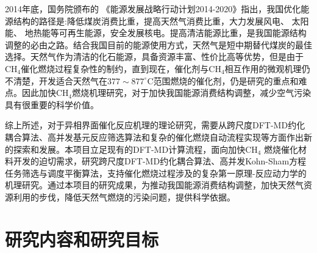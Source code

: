2014年底，国务院颁布的 《能源发展战略行动计划2014-2020》指出，我国优化能源结构的路径是:降低煤炭消费比重，提高天然气消费比重，大力发展风电、 太阳能、 地热能等可再生能源，安全发展核电。提高清洁能源比重，是我国能源结构调整的必由之路。结合我国目前的能源使用方式，天然气是短中期替代煤炭的最佳选择。天然气作为清洁的化石能源，具备资源丰富、性价比高等优势，但是由于$\mathrm{CH}_4$催化燃烧过程复杂性的制约，直到现在，催化剂与$\mathrm{CH}_4$相互作用的微观机理仍不清楚，开发适合天然气在$377\sim877^{\circ}\mathrm{C}$范围燃烧的催化剂，仍是研究的重点和难点。\cite{ProcChem15-242_2003}因此加快$\mathrm{CH}_4$燃烧机理研究，对于加快我国能源消费结构调整，减少空气污染具有很重要的科学价值。

综上所述，对于异相界面催化反应机理的理论研究，需要从跨尺度\textrm{DFT-MD}约化耦合算法、高并发基元反应筛选算法和复杂的催化燃烧自动流程实现等方面作出新的探索和发展。本项目立足现有的\textrm{DFT-MD}计算流程，面向加快$\mathrm{CH}_4$ 燃烧催化材料开发的迫切需求，研究跨尺度\textrm{DFT-MD}约化耦合算法、高并发\textrm{Kohn-Sham}方程任务筛选与调度平衡算法，支持催化燃烧过程涉及的复杂第一原理-反应动力学的机理研究。通过本项目的研究成果，为推动我国能源消费结构调整，加快天然气资源利用的步伐，降低天然气燃烧的污染问题，提供科学依据。


\section{研究内容和研究目标}
